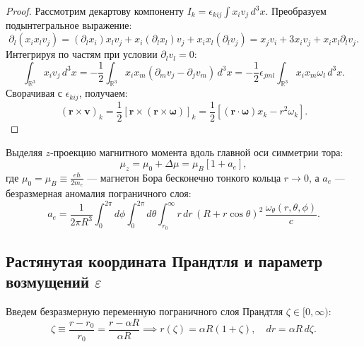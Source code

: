 \documentclass[12pt,a4paper]{article}
\begin{document}
	\begin{proof}
		Рассмотрим декартову компоненту $I_k = \epsilon_{kij} \int x_i v_j \, d^3x$. Преобразуем подынтегральное выражение:
		\begin{equation}
			\partial_l (x_i x_l v_j) = (\partial_l x_i) x_l v_j + x_i (\partial_l x_l) v_j + x_i x_l (\partial_l v_j) = x_j v_i + 3 x_i v_j + x_i x_l \partial_l v_j.
		\end{equation}
		Интегрируя по частям при условии $\partial_l v_l = 0$:
		\begin{equation}
			\int_{\mathbb{R}^3} x_i v_j \, d^3x = -\frac{1}{2} \int_{\mathbb{R}^3} x_i x_m (\partial_m v_j - \partial_j v_m) \, d^3x = -\frac{1}{2} \epsilon_{jml} \int_{\mathbb{R}^3} x_i x_m \omega_l \, d^3x.
		\end{equation}
		Сворачивая с $\epsilon_{kij}$, получаем:
		\begin{equation}
			(\mathbf{r} \times \mathbf{v})_k = \frac{1}{2} \left[ \mathbf{r} \times (\mathbf{r} \times \boldsymbol{\omega}) \right]_k = \frac{1}{2} \left[ (\mathbf{r} \cdot \boldsymbol{\omega}) x_k - r^2 \omega_k \right].
		\end{equation}
	\end{proof}
	
	Выделяя $z$-проекцию магнитного момента вдоль главной оси симметрии тора:
	\begin{equation}
		\mu_z = \mu_0 + \Delta \mu = \mu_B \left[ 1 + a_e \right],
	\end{equation}
	где $\mu_0 = \mu_B \equiv \frac{e\hbar}{2m_e}$ --- магнетон Бора бесконечно тонкого кольца $r \to 0$, а $a_e$ --- безразмерная аномалия пограничного слоя:
	\begin{equation}
		a_e = \frac{1}{2\pi R^3} \int_0^{2\pi} d\phi \int_0^{2\pi} d\theta \int_{r_0}^\infty r \, dr \, (R + r \cos\theta)^2 \, \frac{\omega_\theta(r, \theta, \phi)}{c}.
		\label{eq:master_anomaly_integral}
	\end{equation}
	
	\subsection{Растянутая координата Прандтля и параметр возмущений $\varepsilon$}
	Введем безразмерную переменную пограничного слоя Прандтля $\zeta \in [0, \infty)$:
	\begin{equation}
		\zeta \equiv \frac{r - r_0}{r_0} = \frac{r - \alpha R}{\alpha R} \implies r(\zeta) = \alpha R (1 + \zeta), \quad dr = \alpha R \, d\zeta.
	\end{equation}
	
\end{document}
